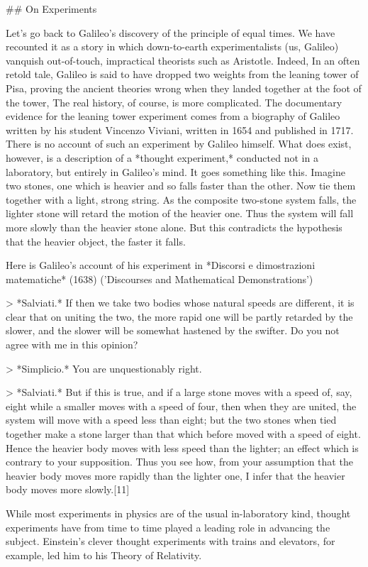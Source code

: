 ## On Experiments

Let's go back to Galileo's discovery of the principle of equal times.  We have recounted it as a story in which down-to-earth experimentalists (us, Galileo) vanquish out-of-touch, impractical theorists such as Aristotle.  Indeed, In an often retold tale, Galileo is said to have dropped two weights from the leaning tower of Pisa, proving the ancient theories wrong when they landed together at the foot of the tower,
The real history, of course, is more complicated. The documentary evidence for the leaning tower experiment comes from a biography of Galileo written by his student Vincenzo Viviani, written in 1654 and published in 1717.  There is no account of such an experiment by Galileo himself.  What does exist, however, is a description of a *thought experiment,* conducted not in a laboratory, but entirely in Galileo's mind. It goes something like this.  Imagine two stones, one which is heavier and so falls faster than the other. Now tie them together with a light, strong string.  As the composite two-stone system falls, the lighter stone will retard the motion of the heavier one.  Thus the system will fall more slowly than the heavier stone alone.  But this contradicts the hypothesis that the heavier object, the faster it falls. 


Here is Galileo's account of his experiment in *Discorsi e dimostrazioni matematiche* (1638) ('Discourses and Mathematical Demonstrations') 

>    *Salviati.* If then we take two bodies whose natural speeds are different, it is clear that on uniting the two, the more rapid one will be partly retarded by the slower, and the slower will be somewhat hastened by the swifter. Do you not agree with me in this opinion?

>    *Simplicio.* You are unquestionably right.

>    *Salviati.* But if this is true, and if a large stone moves with a speed of, say, eight while a smaller moves with a speed of four, then when they are united, the system will move with a speed less than eight; but the two stones when tied together make a stone larger than that which before moved with a speed of eight. Hence the heavier body moves with less speed than the lighter; an effect which is contrary to your supposition. Thus you see how, from your assumption that the heavier body moves more rapidly than the lighter one, I infer that the heavier body moves more slowly.[11]

While most experiments in physics are of the usual in-laboratory kind, thought experiments have from time to time played a leading role in advancing the subject. Einstein's clever thought experiments with trains and elevators, for example, led him to his Theory of Relativity.



